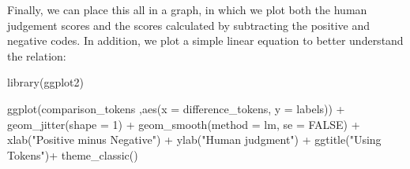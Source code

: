 \documentclass[
]{book}
\newenvironment{Shaded}{\begin{snugshade}}{\end{snugshade}}
\newcommand{\AttributeTok}[1]{\textcolor[rgb]{0.77,0.63,0.00}{#1}}
\newcommand{\ConstantTok}[1]{\textcolor[rgb]{0.00,0.00,0.00}{#1}}
\newcommand{\DecValTok}[1]{\textcolor[rgb]{0.00,0.00,0.81}{#1}}
\newcommand{\FunctionTok}[1]{\textcolor[rgb]{0.00,0.00,0.00}{#1}}
\newcommand{\NormalTok}[1]{#1}
\newcommand{\OtherTok}[1]{\textcolor[rgb]{0.56,0.35,0.01}{#1}}
\newcommand{\SpecialCharTok}[1]{\textcolor[rgb]{0.00,0.00,0.00}{#1}}
\newcommand{\StringTok}[1]{\textcolor[rgb]{0.31,0.60,0.02}{#1}}
\begin{document}
\begin{Shaded}
\end{Shaded}

Finally, we can place this all in a graph, in which we plot both the human judgement scores and the scores calculated by subtracting the positive and negative codes. In addition, we plot a simple linear equation to better understand the relation:

\begin{Shaded}
\begin{Highlighting}[]
\FunctionTok{library}\NormalTok{(ggplot2)}

\FunctionTok{ggplot}\NormalTok{(comparison\_tokens ,}\FunctionTok{aes}\NormalTok{(}\AttributeTok{x =}\NormalTok{ difference\_tokens, }\AttributeTok{y =}\NormalTok{ labels)) }\SpecialCharTok{+}
  \FunctionTok{geom\_jitter}\NormalTok{(}\AttributeTok{shape =} \DecValTok{1}\NormalTok{) }\SpecialCharTok{+}
  \FunctionTok{geom\_smooth}\NormalTok{(}\AttributeTok{method =}\NormalTok{ lm, }\AttributeTok{se =} \ConstantTok{FALSE}\NormalTok{) }\SpecialCharTok{+}
  \FunctionTok{xlab}\NormalTok{(}\StringTok{"Positive minus Negative"}\NormalTok{) }\SpecialCharTok{+}
  \FunctionTok{ylab}\NormalTok{(}\StringTok{"Human judgment"}\NormalTok{) }\SpecialCharTok{+}
  \FunctionTok{ggtitle}\NormalTok{(}\StringTok{"Using Tokens"}\NormalTok{)}\SpecialCharTok{+}
  \FunctionTok{theme\_classic}\NormalTok{()}
\end{Highlighting}
\end{Shaded}
\end{document}
